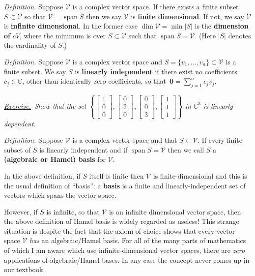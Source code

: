 \documentclass[12pt]{article}
\newcommand{\bzero}{\bm{0}}
\newcommand{\cV}{\mathcal{V}}
\newcommand{\CC}{\mathbb{C}}
\newcommand{\Span}{\operatorname{span}}
\newcommand{\ds}{\displaystyle}
\newcommand{\defin}{\emph{Definition.}\,\,}
\newcommand{\exer}[2]{\emph{\underline{Exercise.}\, #2} \vspace*{#1mm}}
\begin{document}
\defin Suppose $\cV$ is a complex vector space.  If there exists a finite subset $S \subset \cV$ so that $\cV = \Span S$ then we say $\cV$ is \textbf{finite dimensional}.  If not, we say $\cV$ is \textbf{infinite dimensional}.  In the former case $\dim \cV = \min |S|$ is the \textbf{dimension of} $cV$, where the minimum is over $S \subset \cV$ such that $\Span S = \cV$.  (Here $|S|$ denotes the cardinality of $S$.)

\defin Suppose $\cV$ is a complex vector space and $S = \{v_1,\dots,v_n\} \subset \cV$ is a finite subset.  We say $S$ is \textbf{linearly independent} if there exist no coefficients $c_j \in \CC$, other than identically zero coefficients, so that \,$\ds \bzero = \sum_{j=1}^n c_j v_j$.

\exer{30}{Show that the set $\ds \left\{\begin{bmatrix} 1 \\ 0 \\ 0\end{bmatrix}, \begin{bmatrix} 0 \\ 2 \\ 0\end{bmatrix}, \begin{bmatrix} 0 \\ 0 \\ 3 \end{bmatrix}, \begin{bmatrix} 1 \\ 1 \\ 1\end{bmatrix}\right\}$ in $\CC^3$ is linearly dependent.}

\defin Suppose $\cV$ is a complex vector space and that $S \subset \cV$.  If every finite subset of $S$ is linearly independent and if $\Span S = \cV$ then we call $S$ a \textbf{(algebraic or Hamel) basis} for $\cV$.

In the above definition, if $S$ itself is finite then $\cV$ is finite-dimensional and this is the usual definition of ``basis'': a \textbf{basis} is a finite and linearly-independent set of vectors which spans the vector space.

However, if $S$ is infinite, so that $\cV$ is an infinite dimensional vector space, then the above definition of Hamel basis is widely regarded as useless!  This strange situation is despite the fact that the axiom of choice shows that every vector space $\cV$ \emph{has} an algebraic/Hamel basis.  For all of the many parts of mathematics of which I am aware which use infinite-dimensional vector spaces, there are \emph{zero} applications of algebraic/Hamel bases.  In any case the concept never comes up in our textbook.
\end{document}
